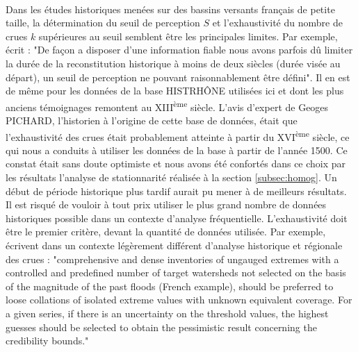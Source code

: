 \documentclass[11pt]{article}
\begin{document}
	\paragraph{} Dans les études historiques menées sur des bassins versants français de petite taille, la détermination du seuil de perception $S$ et l'exhaustivité du nombre de crues $k$ supérieures au seuil semblent être les principales limites. Par exemple, \citet{payrastre_possibility_2005} écrit : "De façon a disposer d'une information fiable nous avons parfois dû limiter la durée de la reconstitution historique à moins de deux siècles (durée visée au départ), un seuil de perception ne pouvant raisonnablement être défini". Il en est de même pour les données de la base HISTRHÔNE utilisées ici et dont les plus anciens témoignages remontent au XIII\textsuperscript{ème} siècle. L'avis d'expert de Geoges PICHARD, l'historien à l'origine de cette base de données, était que l'exhaustivité des crues était probablement atteinte à partir du XVI\textsuperscript{ème} siècle, ce qui nous a conduits à utiliser les données de la base à partir de l'année 1500. Ce constat était sans doute optimiste et nous avons été confortés dans ce choix par les résultats l'analyse de stationnarité réalisée à la section \ref{subsec:homog}. Un début de période historique plus tardif aurait pu mener à de meilleurs résultats. Il est risqué de vouloir à tout prix utiliser le plus grand nombre de données historiques possible dans un contexte d'analyse fréquentielle. L'exhaustivité doit être le premier critère, devant la quantité de données utilisée. Par exemple, \citet{gaume_bayesian_2010} écrivent dans un contexte légèrement différent d'analyse historique et régionale des crues : "comprehensive and dense inventories of ungauged extremes with a controlled and predefined number of target watersheds not selected on the basis of the magnitude of the past floods (French example), should be preferred to loose collations of isolated extreme values with unknown equivalent coverage. For a given series, if there is an uncertainty on the threshold values, the highest guesses should be selected to obtain the pessimistic result concerning the credibility bounds."
	
\end{document}
